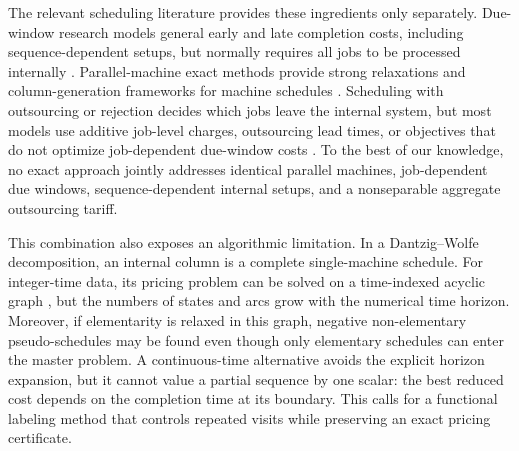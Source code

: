 The relevant scheduling literature provides these ingredients only separately.
Due-window research models general early and late completion costs, including
sequence-dependent setups, but normally requires all jobs to be processed
internally \citep{wan2002tabu,rosa2017algorithms}. Parallel-machine exact methods
provide strong relaxations and column-generation frameworks for machine schedules
\citep{kedad2008lowerbounds,sen2015preemptive,bulhoes2020exact}. Scheduling with
outsourcing or rejection decides which jobs leave the internal system, but most
models use additive job-level charges, outsourcing lead times, or objectives that
do not optimize job-dependent due-window costs
\citep{slotnick2011review,lee2008outsourcing,kim2022flowshop,zhong2022coordinated}.
To the best of our knowledge, no exact approach jointly addresses identical
parallel machines, job-dependent due windows, sequence-dependent internal setups,
and a nonseparable aggregate outsourcing tariff.

This combination also exposes an algorithmic limitation. In a Dantzig--Wolfe
decomposition, an internal column is a complete single-machine schedule. For
integer-time data, its pricing problem can be solved on a time-indexed acyclic
graph \citep{bulhoes2020exact}, but the numbers of states and arcs grow with the
numerical time horizon.
Moreover, if elementarity is relaxed in this graph, negative non-elementary
pseudo-schedules may be found even though only elementary schedules can enter the
master problem. A continuous-time alternative avoids the explicit horizon
expansion, but it cannot value a partial sequence by one scalar: the best reduced
cost depends on the completion time at its boundary. This calls for a functional
labeling method that controls repeated visits while preserving an exact pricing
certificate.

